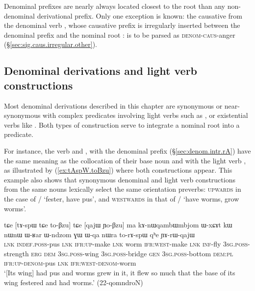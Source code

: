 Denominal prefixes are nearly always located closest to the root than any non-denominal derivational prefix. Only one exception is known: the causative  from the denominal verb , whose causative prefix is irregularly inserted between the denominal prefix  and the nominal root :  is to be parsed as  \textsc{denom}-\textsc{caus}-anger  (§\ref{sec:sig.caus.irregular.other}).

\subsection{Denominal derivations and light verb constructions} \label{sec:denominal.vs.light.verb}
Most denominal derivations described in this chapter are synonymous or near-synonymous with complex predicates involving light verbs such as ,  or existential verbs like . Both types of construction serve to integrate a nominal root into a predicate. 
 
For instance, the verb  and  , with the  denominal prefix (§\ref{sec:denom.intr.rA}) have the same meaning as the collocation of their base noun  and  with the light verb , as illustrated by (\ref{ex:tAspW.toBzu}) where both constructions appear. This example also shows that synonymous denominal and light verb constructions from the same nouns lexically select the same orientation preverbs: \textsc{upwards} in the case of / `fester, have pus', and \textsc{westwards} in that of / `have worms, grow worms'.
 
 \begin{exe}
\ex \label{ex:tAspW.toBzu}
 \gll tɕe [tɤ-spɯ tɕe to-βzu] tɕe [qajɯ ɲo-βzu] ma kɤ-nɯqambɯmbjom ɯ-xɕɤt kɯ nɯnɯ ɯ-ʁar ɯ-ndzom ɣɯ ɯ-qa nɯra to-rɤ-spɯ qʰe ɲɤ-rɯ-qajɯ \\
 \textsc{lnk} \textsc{indef}.\textsc{poss}-pus \textsc{lnk} \textsc{ifr}:\textsc{up}-make \textsc{lnk} worm \textsc{ifr}:\textsc{west}-make \textsc{lnk} \textsc{inf}-fly \textsc{3sg}.\textsc{poss}-strength \textsc{erg} \textsc{dem} \textsc{3sg}.\textsc{poss}-wing \textsc{3sg}.\textsc{poss}-bridge \textsc{gen} \textsc{3sg}.\textsc{poss}-bottom \textsc{dem}:\textsc{pl} \textsc{ifr}:\textsc{up}-\textsc{denom}-pus \textsc{lnk} \textsc{ifr}:\textsc{west}-\textsc{denom}-worm \\
\glt `[Its wing] had pus and worms grew in it, it flew so much that the base of its wing festered and had worms.' (22-qomndroN)
  \end{exe}
  
